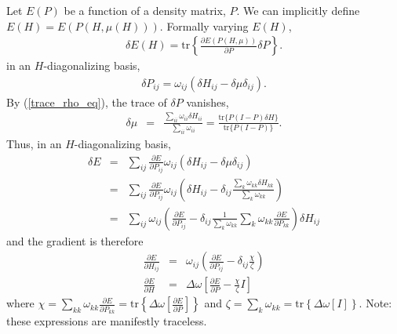 \documentclass[12pt]{iopart}
\newcommand{\beas}{\begin{eqnarray*}}
\newcommand{\enas}{\end{eqnarray*}}
\newcommand{\bea}{\begin{eqnarray}} \newcommand{\ena}{\end{eqnarray}}
\newcommand{\trace}{\mbox{tr}} \newcommand{\real}{\mathcal Re}
\newcommand{\dens}{P}
\begin{document}
Let $E(\dens)$ be a function of a density matrix, $\dens$.
We can implicitly define $E(H) = E(\dens(H,\mu(H)))$.
Formally varying $E(H)$,
\beas
 \delta E(H) =
     \trace\left\{
     \frac{\partial E(\dens(H,\mu))}{\partial \dens} \delta \dens
     \right\}.
\enas
in an $H$-diagonalizing basis,
\beas
 \delta \dens_{ij} = \omega_{ij}
               \left( \delta H_{ij} - \delta \mu \delta_{ij} \right).
\enas
By (\ref{trace_rho_eq}), the trace of $\delta \dens$ vanishes,
\beas
 \delta \mu 
   &=& 
    \frac{\sum_{ii}
      \omega_{ii} \delta H_{ii}
    }{\sum_{ii} \omega_{ii}
    }
   = \frac{ \trace\{ \dens(I-\dens)\delta H \} }
         { \trace\{ \dens(I-\dens) \} }.
\enas
Thus, in an $H$-diagonalizing basis,
\beas
 \delta E
&=& \sum_{ij}
       \frac{\partial E}{\partial \dens_{ij}} 
       \omega_{ij}
        \left( \delta H_{ij} - \delta \mu \delta_{ij} \right)\\
&=& \sum_{ij}
       \frac{\partial E}{\partial \dens_{ij}} 
       \omega_{ij}
       \left(
       \delta H_{ij}
               -
       \delta_{ij}
       \frac{\sum_k \omega_{kk} \delta H_{kk} }
	     {\sum_k \omega_{kk} }
       \right)\\
&=&
    \sum_{ij}
       \omega_{ij}
    \left(
       \frac{\partial E}{\partial \dens_{ij}} 
               -
       \delta_{ij}
         \frac{1}{\sum_k \omega_{kk}}
    \sum_{k} \omega_{kk}
              \frac{\partial E}{\partial \dens_{kk}}
       \right)       \delta H_{ij}
\enas
and the gradient is therefore
\bea
\label{diag_grad_eq}
 \frac{\partial E}{\partial H_{ij}}
  &=& \omega_{ij}\left(
       \frac{\partial E}{\partial \dens_{ij}} 
               -
       \delta_{ij} \frac{\chi}{\zeta}
      \right)\\
\label{nodiag_grad_eq2}
\frac{\partial E}{\partial H}
  &=& \Delta \omega
       \left[\frac{\partial E}{\partial \dens} - 
       \frac{\chi}{\zeta} I
       \right]
\ena
where $\chi = \sum_{kk} \omega_{kk} \frac{\partial E}{\partial \dens_{kk}}
            = \trace\left\{\Delta \omega
               \left[\frac{\partial E}{\partial \dens}\right]\right\}$
and $\zeta = \sum_k \omega_{kk} = \trace\left\{\Delta \omega\left[ I \right]\right\}$.
Note: these expressions are manifestly traceless.
\end{document}

